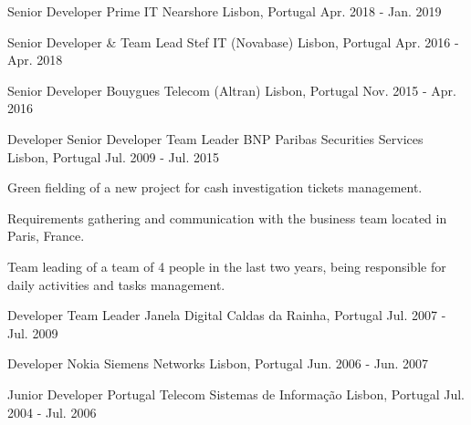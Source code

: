 \begin{cventries}
  \cventry
    {Senior Developer} %
    {Prime IT Nearshore} %
    {Lisbon, Portugal} %
    {Apr. 2018 - Jan. 2019} %
    {
    }

  \cventry
    {Senior Developer \& Team Lead} %
    {Stef IT (Novabase)} %
    {Lisbon, Portugal} %
    {Apr. 2016 - Apr. 2018} %
    {
    }

  \cventry
    {Senior Developer} %
    {Bouygues Telecom (Altran)} %
    {Lisbon, Portugal} %
    {Nov. 2015 - Apr. 2016} %
    {
    }

  \cventry
    {Developer \> Senior Developer \> Team Leader} %
    {BNP Paribas Securities Services} %
    {Lisbon, Portugal} %
    {Jul. 2009 - Jul. 2015} %
    {
      \begin{cvitems} %
        \item {Green fielding of a new project for cash investigation tickets management.}
        \item {Requirements gathering and communication with the business team located in Paris, France.}
        \item {Team leading of a team of 4 people in the last two years, being responsible for daily activities and tasks management.}
      \end{cvitems}
    }

  \cventry
    {Developer \> Team Leader} %
    {Janela Digital} %
    {Caldas da Rainha, Portugal} %
    {Jul. 2007 - Jul. 2009} %
    {
    }

  \cventry
    {Developer} %
    {Nokia Siemens Networks} %
    {Lisbon, Portugal} %
    {Jun. 2006 - Jun. 2007} %
    {
    }

  \cventry
    {Junior Developer} %
    {Portugal Telecom Sistemas de Informação} %
    {Lisbon, Portugal} %
    {Jul. 2004 - Jul. 2006} %
    {
    }

\end{cventries}
